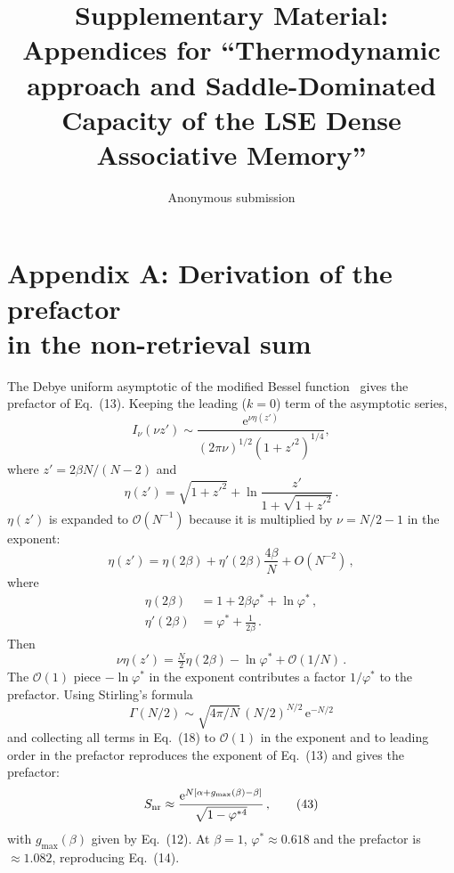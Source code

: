 \documentclass[letterpaper]{article} %
\title{\bfseries Supplementary Material:\\Appendices for ``Thermodynamic approach and Saddle-Dominated Capacity of the LSE Dense Associative Memory''}
\author{Anonymous submission}
\newcommand{\e}{{\mathrm{e}}}
\newcommand{\Bnet}{\beta}
\begin{document}
\maketitle

\appendix

\section{Appendix A: Derivation of the prefactor \\in the non-retrieval sum}

The Debye uniform asymptotic of the modified Bessel function~\citep[10.41.3]{olver2010nist}
gives the prefactor of Eq.~(13). Keeping the leading ($k = 0$) term of
the asymptotic series,
\begin{equation}
I_\nu(\nu z') \sim \frac{\e^{\nu\eta(z')}}{(2\pi\nu)^{1/2}(1+{z'}^2)^{1/4}},
\tag{36}
\end{equation}
where $z' = 2\Bnet N/(N-2)$ and
\begin{equation}
    \eta(z') = \sqrt{1+{z'}^2} + \ln\frac{z'}{1+\sqrt{1+{z'}^2}}\,.
    \tag{37}
    \label{eq:bessel_debye}
\end{equation}
$\eta(z')$ is expanded to $\mathcal{O}(N^{-1})$ because it is multiplied by
$\nu = N/2 - 1$ in the exponent:
\begin{equation}
    \eta(z') = \eta(2\Bnet) + \eta'(2\Bnet) \frac{4\Bnet}{N} + O(N^{-2})\,,
    \tag{38}
\end{equation}
where
\begin{align}
    \eta(2\Bnet)  &= 1 + 2\Bnet\varphi^* + \ln\varphi^*\,, \tag{39}\\
    \eta'(2\Bnet) &= \varphi^* + \frac{1}{2\Bnet}\,. \tag{40}
\end{align}
Then
\begin{equation}
    \nu \eta(z') = \tfrac{N}{2} \eta(2\Bnet) - \ln\varphi^* + \mathcal{O}(1/N)\,.
    \tag{41}
\end{equation}
The $\mathcal{O}(1)$ piece $-\ln\varphi^*$ in the exponent contributes a factor
$1/\varphi^*$ to the prefactor. Using Stirling's formula
\begin{equation}
    \Gamma(N/2) \sim \sqrt{4\pi/N}\,(N/2)^{N/2}\,\e^{-N/2}
    \tag{42}
\end{equation}
and collecting all terms in Eq.~(18) to $\mathcal{O}(1)$ in the
exponent and to leading order in the prefactor reproduces the exponent
of Eq.~(13) and gives the prefactor:
\begin{equation}
S_{\rm nr} \approx \frac{\e^{N[\alpha + g_{\max}(\Bnet) - \Bnet]}}{\sqrt{1-\varphi^{*4}}}\,,
\tag{43}
\end{equation}
with $g_{\max}(\Bnet)$ given by Eq.~(12).
At $\Bnet = 1$, $\varphi^* \approx 0.618$ and the prefactor is $\approx 1.082$, reproducing Eq.~(14).
\end{document}
